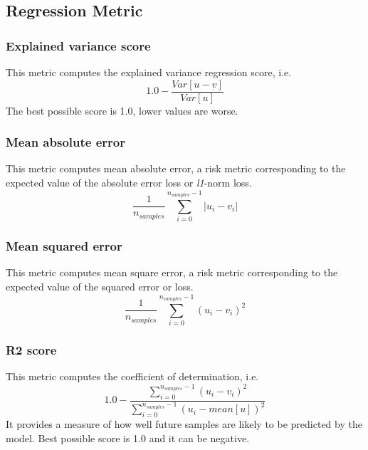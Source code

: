 \subsection{Regression Metric}
\label{subsection:regression}

\subsubsection{Explained variance score}
This metric computes the explained variance regression score, i.e.
\begin{equation}
  1.0 - \frac{Var[u-v]}{Var[u]}
\end{equation}
The best possible score is 1.0, lower values are worse.


\subsubsection{Mean absolute error}
This metric computes mean absolute error, a risk metric corresponding to the expected value of the absolute
error loss or \textit{l1}-norm loss.
\begin{equation}
  \frac{1}{n_{samples}}\sum_{i=0}^{n_{samples}-1}|u_i-v_i|
\end{equation}


\subsubsection{Mean squared error}
This metric computes mean square error, a risk metric corresponding to the expected value of the
squared error or loss.
\begin{equation}
  \frac{1}{n_{samples}}\sum_{i=0}^{n_{samples}-1}(u_i-v_i)^2
\end{equation}


\subsubsection{R2 score}
This metric computes the coefficient of determination, i.e.
\begin{equation}
  1.0-\frac{\sum_{i=0}^{n_{samples}-1}(u_i-v_i)^2}{\sum_{i=0}^{n_{samples}-1}(u_i-mean[u])^2}
\end{equation}
It provides a measure of how well future samples are likely to be predicted by the model.
Best possible score is 1.0 and it can be negative.

